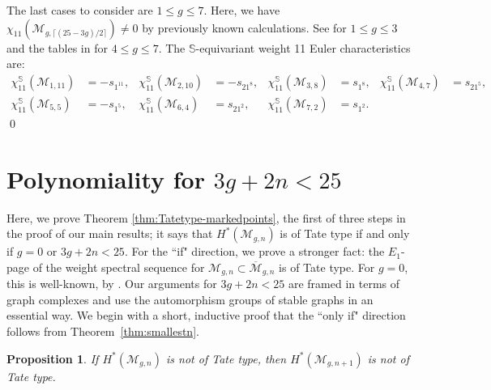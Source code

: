 \documentclass[12pt]{amsart}
\newtheorem{prop}[thm]{Proposition}
\theoremstyle{definition}
\numberwithin{equation}{section}
\renewcommand{\ss}{\mathbb{S}}
\newcommand{\M}{\mathcal{M}}
\newcommand{\ocM}{\overline{\mathcal{M}}}
\newcommand{\cM}{\mathcal{M}}
\theoremstyle{definition} %
\theoremstyle{remark}
\begin{document}
The last cases to consider are $1 \leq g \leq 7$. Here, we have $\chi_{11}(\cM_{g,\lceil (25-3g)/2 \rceil}) \neq 0$ by previously known calculations.  See \cite{BergstromData} for $1 \leq g \leq 3$ and the tables in \cite[Section~7]{PayneWillwacher24} for $4 \leq g \leq 7$.  The $\ss$-equivariant weight 11 Euler characteristics are:
\begin{align*}
\chi_{11}^\ss(\cM_{1,11}) & = -s_{1^{11}}, & \chi_{11}^\ss(\cM_{2,10}) & = -s_{21^8}, & \chi_{11}^\ss(\cM_{3,8}) & = s_{1^8}, &
\chi_{11}^\ss(\cM_{4,7}) & = s_{21^5}, \\
\chi_{11}^\ss(\cM_{5,5}) & = -s_{1^5}, & \chi_{11}^\ss(\cM_{6,4}) & = s_{21^2}, &
\chi_{11}^\ss(\cM_{7,2}) & = s_{1^2}. &  
\end{align*}
\vskip-19pt
\hfill \qed


\section{Polynomiality for \texorpdfstring{$3g+2n<25$}{gleq8}}\label{sec:polycount}
Here, we prove Theorem \ref{thm:Tatetype-markedpoints}, the first of three steps in the proof of our main results; it says that $H^*(\cM_{g,n})$ is of Tate type if and only if $g = 0$ or $3g + 2n < 25$. For the ``if" direction, we prove a stronger fact: the $E_1$-page of the weight spectral sequence for $\cM_{g,n} \subset \ocM_{g,n}$ is of Tate type. For $g = 0$, this is well-known, by \cite{Keel}.  Our arguments for $3g + 2n < 25$ are framed in terms of graph complexes and use the automorphism groups of stable graphs in an essential way. We begin with a short, inductive proof that the ``only if" direction follows from Theorem~\ref{thm:smallestn}.

\begin{prop} \label{prop:nonTate-induction}
If $H^*(\M_{g,n})$ is not of Tate type, then $H^*(\M_{g,n+1})$ is not of Tate type.
\end{prop}
\end{document}
